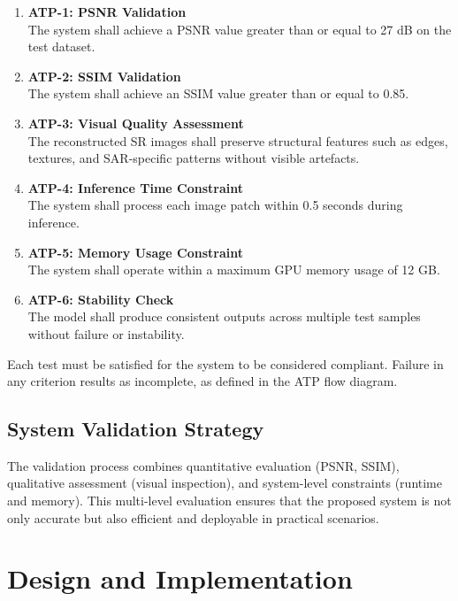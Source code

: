 \documentclass[conference]{IEEEtran}
\begin{document}
\begin{enumerate}
    \item \textbf{ATP-1: PSNR Validation}\\
    The system shall achieve a PSNR value greater than or equal to 27 dB on the test dataset.

    \item \textbf{ATP-2: SSIM Validation}\\
    The system shall achieve an SSIM value greater than or equal to 0.85.

    \item \textbf{ATP-3: Visual Quality Assessment}\\
    The reconstructed SR images shall preserve structural features such as edges, textures, and SAR-specific patterns without visible artefacts.

    \item \textbf{ATP-4: Inference Time Constraint}\\
    The system shall process each image patch within 0.5 seconds during inference.

    \item \textbf{ATP-5: Memory Usage Constraint}\\
    The system shall operate within a maximum GPU memory usage of 12 GB\@.

    \item \textbf{ATP-6: Stability Check}\\
    The model shall produce consistent outputs across multiple test samples without failure or instability.

\end{enumerate}

Each test must be satisfied for the system to be considered compliant. Failure in any criterion results as incomplete, as defined in the ATP flow diagram.

\subsection{System Validation Strategy}

The validation process combines quantitative evaluation (PSNR, SSIM), qualitative assessment (visual inspection), and system-level constraints (runtime and memory). This multi-level evaluation ensures that the proposed system is not only accurate but also efficient and deployable in practical scenarios.


\section{Design and Implementation}
\end{document}

